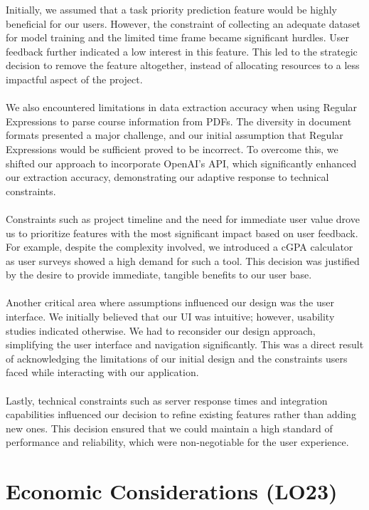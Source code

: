 \documentclass{article}
\begin{document}
Initially, we assumed that a task priority prediction feature would be highly beneficial for our users. However, the constraint of collecting an adequate dataset for model training and the limited time frame became significant hurdles. User feedback further indicated a low interest in this feature. This led to the strategic decision to remove the feature altogether, instead of allocating resources to a less impactful aspect of the project.\\
\\
We also encountered limitations in data extraction accuracy when using Regular Expressions to parse course information from PDFs. The diversity in document formats presented a major challenge, and our initial assumption that Regular Expressions would be sufficient proved to be incorrect. To overcome this, we shifted our approach to incorporate OpenAI's API, which significantly enhanced our extraction accuracy, demonstrating our adaptive response to technical constraints.\\
\\
Constraints such as project timeline and the need for immediate user value drove us to prioritize features with the most significant impact based on user feedback. For example, despite the complexity involved, we introduced a cGPA calculator as user surveys showed a high demand for such a tool. This decision was justified by the desire to provide immediate, tangible benefits to our user base.\\
\\
Another critical area where assumptions influenced our design was the user interface. We initially believed that our UI was intuitive; however, usability studies indicated otherwise. We had to reconsider our design approach, simplifying the user interface and navigation significantly. This was a direct result of acknowledging the limitations of our initial design and the constraints users faced while interacting with our application.\\
\\
Lastly, technical constraints such as server response times and integration capabilities influenced our decision to refine existing features rather than adding new ones. This decision ensured that we could maintain a high standard of performance and reliability, which were non-negotiable for the user experience.
\section{Economic Considerations (LO23)}
\end{document}
